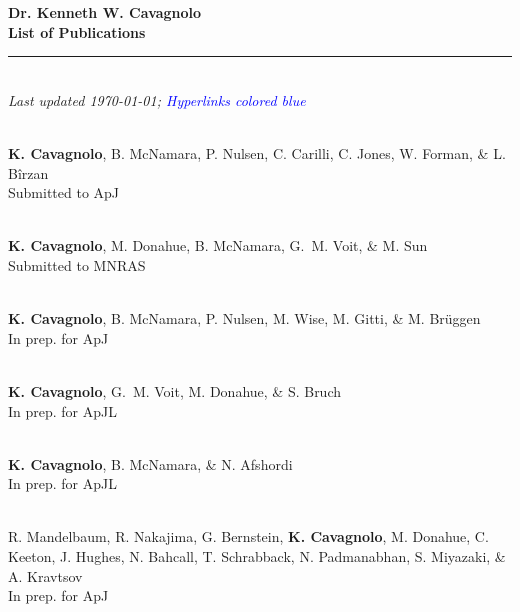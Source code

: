 \documentclass[12pt]{cv}
\begin{document}
\begin{center}
{\large \textbf{Dr. Kenneth W. Cavagnolo\\List of Publications}}\\
\rule{17.35cm}{2pt}\\
\footnotesize
{\it Last updated \today; \textcolor{blue}{Hyperlinks colored blue}}
\normalsize
\end{center}

\begin{llist}



{}\\
{\bf K. Cavagnolo}, B. McNamara, P. Nulsen, C. Carilli, C. Jones, W. Forman, \& L. B\^irzan\\
Submitted to ApJ

{}\\
{\bf K. Cavagnolo}, M. Donahue, B. McNamara, G.~M. Voit, \& M. Sun\\
Submitted to MNRAS

{}\\
{\bf K. Cavagnolo}, B. McNamara, P. Nulsen, M. Wise, M. Gitti, \& M. Br\"uggen\\
In prep. for ApJ

{}\\
{\bf K. Cavagnolo}, G.~M. Voit, M. Donahue, \& S. Bruch\\
In prep. for ApJL

{}\\
{\bf K. Cavagnolo}, B. McNamara, \& N. Afshordi\\
In prep. for ApJL

{}\\
R. Mandelbaum, R. Nakajima, G. Bernstein, {\bf K. Cavagnolo}, M. Donahue, C. Keeton, J. Hughes, N. Bahcall, T. Schrabback, N. Padmanabhan, S. Miyazaki, \& A. Kravtsov\\
In prep. for ApJ


\end{llist}
\end{document}

